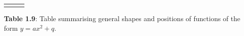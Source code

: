 \begin{center}
\begin{xtabular*}{\mytablewidth}[t]{|p{10\mystarwidth}|p{10\mystarwidth}|p{10\mystarwidth}|}
\begin{center}
      \vspace{2pt}
    \vspace{.1in}
    
    \end{center}



    \addtocounter{footnote}{-0}
    
     \tabularnewline{}
    \end{xtabular*}
      \end{center}
    \begin{center}{\small\bfseries Table 1.9}: Table summarising general shapes and positions of functions of the form \begin{math}y=a{x}^{2}+q\end{math}.\end{center}
    
    \addtocounter{footnote}{-0}
    
    \par
        \label{m39345*uid117}
            \nopagebreak
            

